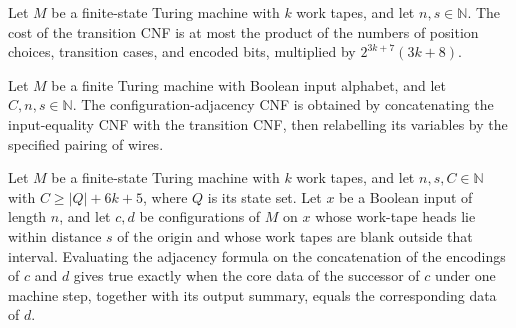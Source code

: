\begin{theorem}
\label{Complexity.codecTransitionCNF_cost}
\leanok
{}
Let $M$ be a finite-state Turing machine with $k$ work tapes, and let
$n,s\in\mathbb{N}$. The cost of the transition CNF is at most the product of the numbers
of position choices, transition cases, and encoded bits, multiplied by $2^{3k+7}(3k+8)$.
\end{theorem}

\begin{definition}
\label{Complexity.configurationAdjacency}
\leanok
{}
Let $M$ be a finite Turing machine with Boolean input alphabet, and let
$C,n,s\in\mathbb{N}$. The configuration-adjacency CNF is obtained by concatenating the
input-equality CNF with the transition CNF, then relabelling its variables by the
specified pairing of wires.
\end{definition}

\begin{theorem}
\label{Complexity.configurationAdjacency_eval}
\leanok
{}
Let $M$ be a finite-state Turing machine with $k$ work tapes, and let $n,s,C\in\mathbb
N$ with $C\ge |Q|+6k+5$, where $Q$ is its state set. Let $x$ be a Boolean input of
length $n$, and let $c,d$ be configurations of $M$ on $x$ whose work-tape heads lie
within distance $s$ of the origin and whose work tapes are blank outside that interval.
Evaluating the adjacency formula on the concatenation of the encodings of $c$ and $d$
gives true exactly when the core data of the successor of $c$ under one machine step,
together with its output summary, equals the corresponding data of $d$.
\end{theorem}

